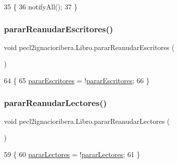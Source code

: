 \begin{DoxyCode}
35     \{
36         notifyAll();
37     \}
\end{DoxyCode}
\mbox{\label{classpecl2ignacioribera_1_1_libro_aa841d46804bc4a70f1f1fc5300257380}} 
\subsubsection{\texorpdfstring{parar\+Reanudar\+Escritores()}{pararReanudarEscritores()}}
{\footnotesize\ttfamily void pecl2ignacioribera.\+Libro.\+parar\+Reanudar\+Escritores (\begin{DoxyParamCaption}{ }\end{DoxyParamCaption})\hspace{0.3cm}{\ttfamily [inline]}}


\begin{DoxyCode}
64     \{
65         \mbox{\hyperlink{classpecl2ignacioribera_1_1_libro_a8925b951b1b46dc4c3620730cd28480a}{pararEscritores}} = !\mbox{\hyperlink{classpecl2ignacioribera_1_1_libro_a8925b951b1b46dc4c3620730cd28480a}{pararEscritores}};
66     \}
\end{DoxyCode}
\mbox{\label{classpecl2ignacioribera_1_1_libro_aec141b6a8787d8af7f1596a42283d378}} 
\subsubsection{\texorpdfstring{parar\+Reanudar\+Lectores()}{pararReanudarLectores()}}
{\footnotesize\ttfamily void pecl2ignacioribera.\+Libro.\+parar\+Reanudar\+Lectores (\begin{DoxyParamCaption}{ }\end{DoxyParamCaption})\hspace{0.3cm}{\ttfamily [inline]}}


\begin{DoxyCode}
59     \{
60         \mbox{\hyperlink{classpecl2ignacioribera_1_1_libro_a5d69f4d0825673ec1882cfdb390217a9}{pararLectores}} = !\mbox{\hyperlink{classpecl2ignacioribera_1_1_libro_a5d69f4d0825673ec1882cfdb390217a9}{pararLectores}};
61     \}
\end{DoxyCode}
\mbox{\label{classpecl2ignacioribera_1_1_libro_aa68bbbcfa16984a13f848e8a2038c97a}} 
